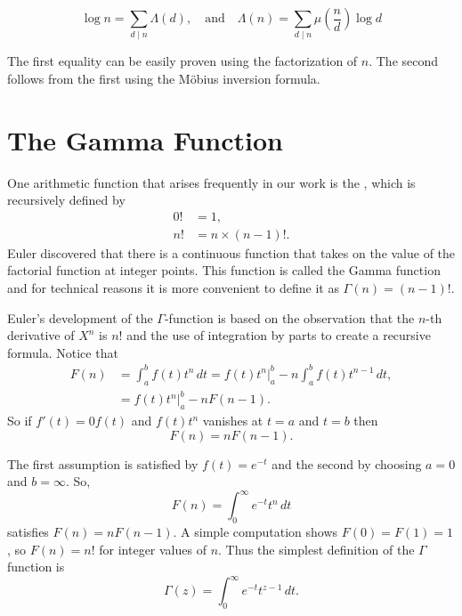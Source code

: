 \begin{proposition}
\label{Lambda:Fn:Prop}
\[
 \log n  = \sum_{d \mid n} \Lambda (d), \quad\mbox{and}\quad
 \Lambda(n) = \sum_{d\mid n} \mu(\frac{n}{d}) \log d
\]
\end{proposition}
The first equality can be easily proven using the factorization of $n$.
The second follows from the first using the M\"obius inversion formula.

\section{The Gamma Function}
\label{GammaFunction:Sec}

One arithmetic function that arises frequently in our work is the
, which is recursively defined by 
\[
\begin{aligned}
0! & =  1, \\
n! &= n \times (n-1)!.
\end{aligned}
\]
Euler discovered that there is a continuous function that takes on the
value of the factorial function at integer points.  This function is
called the Gamma function and for technical reasons it is more
convenient to define it as $\Gamma(n) = (n-1)!$.

Euler's development of the $\Gamma$-function is based on the
observation that the $n$-th derivative of $X^n$ is $n!$ and the use
of integration by parts to create a recursive formula.  Notice that
\[
\begin{aligned}
F(n) & = \int^b_a f(t) t^n \, dt  = 
\left.f(t) t^n \right|^b_a - n \int_a^b f(t) t^{n-1}\, dt, \\
& = \left.f(t) t^n \right|^b_a - n F(n-1). 
\end{aligned}
\]
So if $f'(t) = 0 f(t)$ and $f(t) t^n$ vanishes at $t=a$ and $t=b$ then
\[
F(n) = n F(n-1).
\]

The first assumption is satisfied by $f(t) = e^{-t}$ and the second by
choosing $a=0$ and $b=\infty$.  So,
\[
F(n) = \int_0^{\infty} e^{-t} t^n \, dt
\]
satisfies $F(n) = n F(n-1)$.  A simple computation shows $F(0) = F(1)
= 1$, so $F(n) = n!$ for integer values of $n$.  Thus the simplest
definition of the $\Gamma$ function is
\begin{equation} \label{GammaIntegralDef:Eq}
\Gamma(z) = \int_0^{\infty} e^{-t} t^{z-1} \, dt.
\end{equation}

